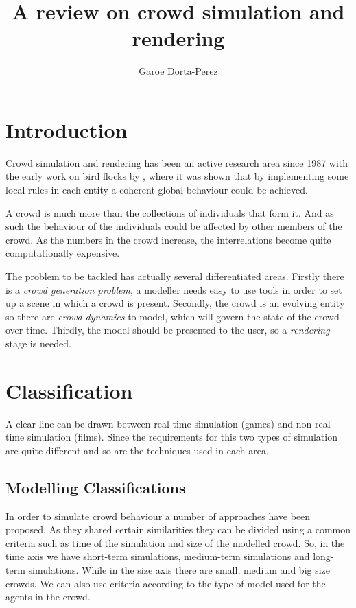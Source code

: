 \documentclass[conference]{acmsiggraph}
\title{A review on crowd simulation and rendering}
\author{Garoe Dorta-Perez}
\begin{document}
\maketitle


\section{Introduction}

Crowd simulation and rendering has been an active research area since 1987  with the early work on bird flocks by \cite{Reynolds1987}, where it was shown that by implementing some local rules in each entity a coherent global behaviour could be achieved.
 
A crowd is much more than the collections of individuals that form it.
And as such the behaviour of the individuals could be affected by other members of the crowd.
As the numbers in the crowd increase, the interrelations become quite computationally expensive.

The problem to be tackled has actually several differentiated areas.
Firstly there is a \textit{crowd generation problem}, a modeller needs easy to use tools in order to set up a scene in which a crowd is present.
Secondly, the crowd is an evolving entity so there are \textit{crowd dynamics} to model, which will govern the state of the crowd over time.
Thirdly, the model should be presented to the user, so a \textit{rendering} stage is needed.

\section{Classification}

A clear line can be drawn between real-time simulation (games) and non real-time simulation (films).
Since the requirements for this two types of simulation are quite different and so are the techniques used in each area.

\subsection{Modelling Classifications}

In order to simulate crowd behaviour a number of approaches have been proposed.
As they shared certain similarities they can be divided using a common criteria such as time of the simulation and size of the modelled crowd.
So, in the time axis we have short-term simulations, medium-term simulations and long-term simulations.
While in the size axis there are small, medium and big size crowds.
We can also use criteria according to the type of model used for the agents in the crowd.
\end{document}
